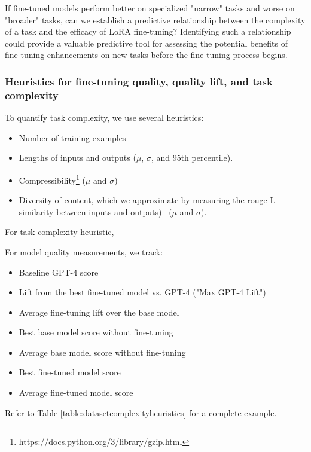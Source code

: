 If fine-tuned models perform better on specialized "narrow" tasks and worse on "broader" tasks,  can we establish a predictive relationship between the complexity of a task and the efficacy of LoRA fine-tuning?  Identifying such a relationship could provide a valuable predictive tool for assessing the potential benefits of fine-tuning enhancements on new tasks before the fine-tuning process begins.

\subsubsection{Heuristics for fine-tuning quality, quality lift, and task complexity}

To quantify task complexity, we use several heuristics:

\begin{itemize}
    \item Number of training examples
    \item Lengths of inputs and outputs ($\mu$, $\sigma$, and 95th percentile).
    \item Compressibility\footnote{https://docs.python.org/3/library/gzip.html} ($\mu$ and $\sigma$)
    \item Diversity of content, which we approximate by measuring the rouge-L similarity between inputs and outputs)~\cite{50wang2022selfinstruct} ($\mu$ and $\sigma$).
\end{itemize}

For task complexity heuristic, 

For model quality measurements, we track:

\begin{itemize}
    \item Baseline GPT-4 score
    \item Lift from the best fine-tuned model vs. GPT-4 ("Max GPT-4 Lift")
    \item Average fine-tuning lift over the base model
    \item Best base model score without fine-tuning
    \item Average base model score without fine-tuning
    \item Best fine-tuned model score
    \item Average fine-tuned model score

\end{itemize}

Refer to Table \ref{table:datasetcomplexityheuristics} for a complete example.

